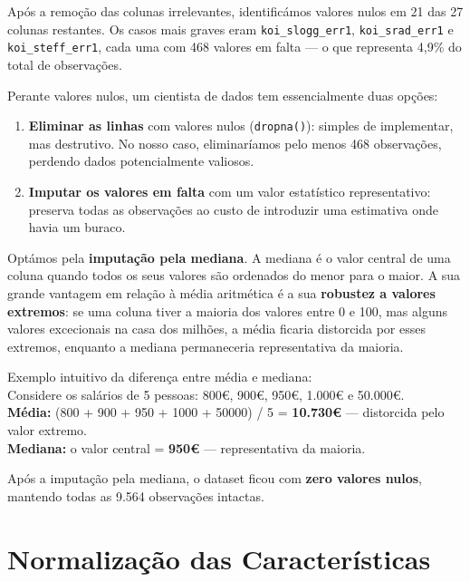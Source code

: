 \documentclass[12pt, a4paper]{report}
\begin{document}
Após a remoção das colunas irrelevantes, identificámos valores nulos em 21 das 27 colunas restantes. Os casos mais graves eram \texttt{koi\_slogg\_err1}, \texttt{koi\_srad\_err1} e \texttt{koi\_steff\_err1}, cada uma com 468 valores em falta — o que representa 4,9\% do total de observações.

Perante valores nulos, um cientista de dados tem essencialmente duas opções:

\begin{enumerate}
    \item \textbf{Eliminar as linhas} com valores nulos (\texttt{dropna()}): simples de implementar, mas destrutivo. No nosso caso, eliminaríamos pelo menos 468 observações, perdendo dados potencialmente valiosos.

    \item \textbf{Imputar os valores em falta} com um valor estatístico representativo: preserva todas as observações ao custo de introduzir uma estimativa onde havia um buraco.
\end{enumerate}

Optámos pela \textbf{imputação pela mediana}. A mediana é o valor central de uma coluna quando todos os seus valores são ordenados do menor para o maior. A sua grande vantagem em relação à média aritmética é a sua \textbf{robustez a valores extremos}: se uma coluna tiver a maioria dos valores entre 0 e 100, mas alguns valores excecionais na casa dos milhões, a média ficaria distorcida por esses extremos, enquanto a mediana permaneceria representativa da maioria.

\begin{caixaconceito}
Exemplo intuitivo da diferença entre média e mediana:\\
Considere os salários de 5 pessoas: 800€, 900€, 950€, 1.000€ e 50.000€.\\
\textbf{Média:} (800 + 900 + 950 + 1000 + 50000) / 5 = \textbf{10.730€} — distorcida pelo valor extremo.\\
\textbf{Mediana:} o valor central = \textbf{950€} — representativa da maioria.
\end{caixaconceito}

\begin{caixaresultado}
Após a imputação pela mediana, o dataset ficou com \textbf{zero valores nulos}, mantendo todas as 9.564 observações intactas.
\end{caixaresultado}

\section{Normalização das Características}
\end{document}
